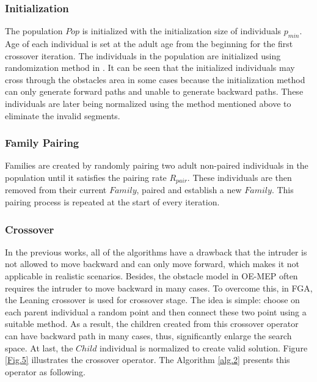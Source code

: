 \documentclass[final]{elsarticle}
\begin{document}
\subsubsection{Initialization}

The population $Pop$ is initialized with the initialization size of individuals $p_{min}$. Age of each individual is set at the adult age from the beginning for the first crossover iteration. The individuals in the population are initialized using randomization method in \cite{binh2019efficient}. It can be seen that the initialized individuals may cross through the obstacles area in some cases because the initialization method can only generate forward paths and unable to generate backward paths. These individuals are later being normalized using the method mentioned above to eliminate the invalid segments.

\subsubsection{Family Pairing}

Families are created by randomly pairing two adult non-paired individuals in the population until it satisfies the pairing rate $R_{pair}$. These individuals are then removed from their current $ Family $, paired and establish a new $Family$. This pairing process is repeated at the start of every iteration.

\subsubsection{Crossover}

In the previous works, all of the algorithms have a drawback that the intruder is not allowed to move backward and can only move forward, which makes it not applicable in realistic scenarios. Besides, the obstacle model in OE-MEP often requires the intruder to move backward in many cases. To overcome this, in FGA, the Leaning crossover is used for crossover stage. The idea is simple: choose on each parent individual a random point and then connect these two point using a suitable method. As a result, the children created from this crossover operator can have backward path in many cases, thus, significantly enlarge the search space. At last, the $Child$ individual is normalized to create valid solution. Figure \ref{Fig.5} illustrates the crossover operator. The Algorithm \ref{alg.2} presents this operator as following.
\end{document}
